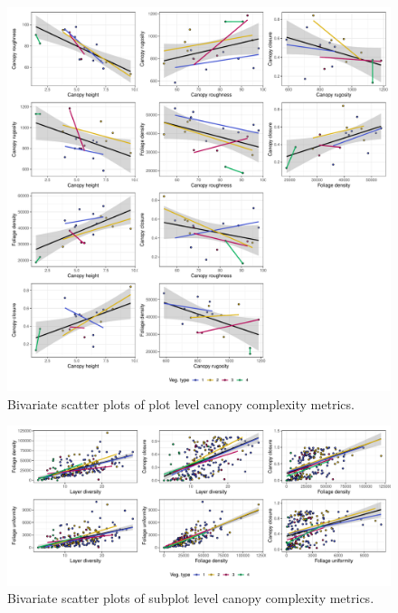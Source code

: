 \documentclass[11pt,a4paper]{article}
\begin{document}
\begin{figure}
	\includegraphics[width=\linewidth]{canopy_metric_comp_plot}
	\caption{Bivariate scatter plots of plot level canopy complexity metrics.}
	\label{canopy_metric_comp_plot}
\end{figure}

\begin{figure}
	\includegraphics[width=\linewidth]{canopy_metric_comp_subplot}
	\caption{Bivariate scatter plots of subplot level canopy complexity metrics.}
	\label{canopy_metric_comp_subplot}
\end{figure}
\end{document}
